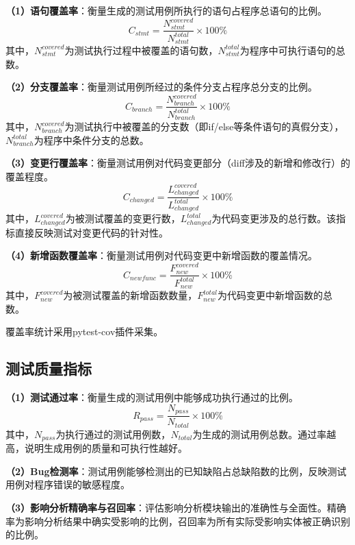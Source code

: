 \textbf{（1）语句覆盖率}：衡量生成的测试用例所执行的语句占程序总语句的比例。
\begin{equation}
    C_{stmt} = \frac{N_{stmt}^{covered}}{N_{stmt}^{total}} \times 100\%
\end{equation}
其中，$N_{stmt}^{covered}$为测试执行过程中被覆盖的语句数，$N_{stmt}^{total}$为程序中可执行语句的总数。

\textbf{（2）分支覆盖率}：衡量测试用例所经过的条件分支占程序总分支的比例。
\begin{equation}
    C_{branch} = \frac{N_{branch}^{covered}}{N_{branch}^{total}} \times 100\%
\end{equation}
其中，$N_{branch}^{covered}$为测试执行中被覆盖的分支数（即if/else等条件语句的真假分支），$N_{branch}^{total}$为程序中条件分支的总数。

\textbf{（3）变更行覆盖率}：衡量测试用例对代码变更部分（diff涉及的新增和修改行）的覆盖程度。
\begin{equation}
    C_{changed} = \frac{L_{changed}^{covered}}{L_{changed}^{total}} \times 100\%
\end{equation}
其中，$L_{changed}^{covered}$为被测试覆盖的变更行数，$L_{changed}^{total}$为代码变更涉及的总行数。该指标直接反映测试对变更代码的针对性。

\textbf{（4）新增函数覆盖率}：衡量测试用例对代码变更中新增函数的覆盖情况。
\begin{equation}
    C_{newfunc} = \frac{F_{new}^{covered}}{F_{new}^{total}} \times 100\%
\end{equation}
其中，$F_{new}^{covered}$为被测试覆盖的新增函数数量，$F_{new}^{total}$为代码变更中新增函数的总数。

覆盖率统计采用pytest-cov插件采集。

\subsection{测试质量指标}
\label{ssec:quality_metrics}

\textbf{（1）测试通过率}：衡量生成的测试用例中能够成功执行通过的比例。
\begin{equation}
    R_{pass} = \frac{N_{pass}}{N_{total}} \times 100\%
\end{equation}
其中，$N_{pass}$为执行通过的测试用例数，$N_{total}$为生成的测试用例总数。通过率越高，说明生成用例的质量和可执行性越好。

\textbf{（2）Bug检测率}：测试用例能够检测出的已知缺陷占总缺陷数的比例，反映测试用例对程序错误的敏感程度。

\textbf{（3）影响分析精确率与召回率}：评估影响分析模块输出的准确性与全面性。精确率为影响分析结果中确实受影响的比例，召回率为所有实际受影响实体被正确识别的比例。

